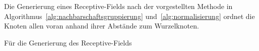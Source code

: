 Die Generierung eines Receptive-Fields nach der vorgestellten Methode in Algorithmus~\ref{alg:nachbarschaftsgruppierung} und~\ref{alg:normalisierung} ordnet die Knoten allen voran anhand ihrer Abstände zum Wurzelknoten.


Für die Generierung des Receptive-Fields









\begin{algorithm}[t]
\centering
\begin{algorithmic}
  \REQUIRE{}
  \ENSURE{}
\end{algorithmic}
\caption[]{}
\label{alg:spirale}
\end{algorithm}
